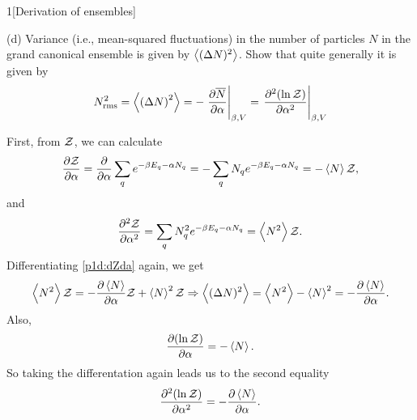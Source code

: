 \documentclass[12pt]{article}
\begin{document}
\begin{problem}{1}[Derivation of ensembles]

(d) Variance (i.e., mean-squared fluctuations) in the number of particles $N$ in
the grand canonical ensemble is given by $\expval{(\Delta N)^2}$. Show that
quite generally it is given by
\begin{equation}
    N_\text{rms}^2=\expval{\qty(\Delta
    N)^2}=-\eval{\frac{\partial\overline{N}}{\partial\alpha}}_{\beta,V}
    =\eval{\frac{\partial^2(\ln\mathcal{Z})}{\partial\alpha^2}}_{\beta,V}
\end{equation}
\begin{solution}
First, from $\mathcal{Z}$, we can calculate
\begin{align}\label{p1d:dZda}
    \frac{\partial\mathcal{Z}}{\partial\alpha}
    =\frac{\partial}{\partial\alpha}\sum_qe^{-\beta E_q-\alpha N_q}
    =-\sum_qN_qe^{-\beta E_q-\alpha N_q}
    =-\expval{N}\mathcal{Z},
\end{align}
and
\begin{align}
    \frac{\partial^2\mathcal{Z}}{\partial\alpha^2}
    =\sum_qN_q^2e^{-\beta E_q-\alpha N_q}
    =\expval{N^2}\mathcal{Z}.
\end{align}
Differentiating \eqref{p1d:dZda} again, we get
\begin{equation}
    \expval{N^2}\mathcal{Z}=-\frac{\partial\expval{N}}{\partial\alpha}\mathcal{Z}
    +\expval{N}^2\mathcal{Z}
    \Rightarrow\expval{(\Delta
    N)^2}=\expval{N^2}-\expval{N}^2=-\frac{\partial\expval{N}}{\partial\alpha}.
\end{equation}
Also,
\begin{equation}
    \frac{\partial(\ln\mathcal{Z})}{\partial\alpha}=-\expval{N}.
\end{equation}
So taking the differentation again leads us to the second equality
\begin{equation}
    \frac{\partial^2(\ln\mathcal{Z})}{\partial\alpha^2}=-\frac{\partial\expval{N}}{\partial\alpha}
    .
\end{equation}
\end{solution}
\end{problem}
\newpage
\end{document}
